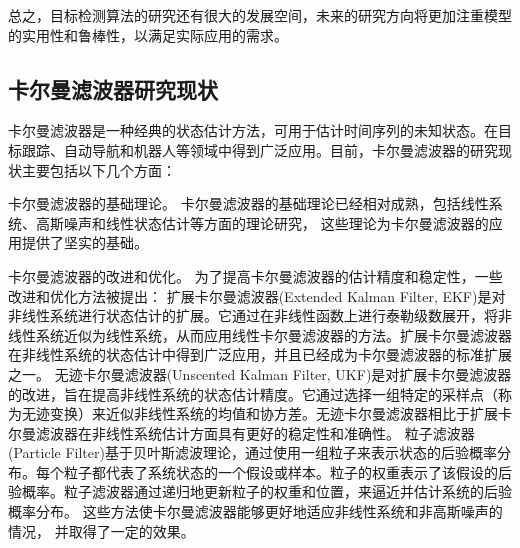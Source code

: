 总之，目标检测算法的研究还有很大的发展空间，未来的研究方向将更加注重模型的实用性和鲁棒性，以满足实际应用的需求。

\subsection{卡尔曼滤波器研究现状}
卡尔曼滤波器是一种经典的状态估计方法，可用于估计时间序列的未知状态。在目标跟踪、自动导航和机器人等领域中得到广泛应用。目前，卡尔曼滤波器的研究现状主要包括以下几个方面：
\par
卡尔曼滤波器的基础理论。
卡尔曼滤波器的基础理论已经相对成熟，包括线性系统、高斯噪声和线性状态估计等方面的理论研究，
这些理论为卡尔曼滤波器的应用提供了坚实的基础。
\par
卡尔曼滤波器的改进和优化。
为了提高卡尔曼滤波器的估计精度和稳定性，一些改进和优化方法被提出：
扩展卡尔曼滤波器(Extended Kalman Filter, EKF)\cite{ribeiro2004kalman}是对非线性系统进行状态估计的扩展。它通过在非线性函数上进行泰勒级数展开，将非线性系统近似为线性系统，从而应用线性卡尔曼滤波器的方法。扩展卡尔曼滤波器在非线性系统的状态估计中得到广泛应用，并且已经成为卡尔曼滤波器的标准扩展之一。
无迹卡尔曼滤波器(Unscented Kalman Filter, UKF)\cite{wan2000unscented}是对扩展卡尔曼滤波器的改进，旨在提高非线性系统的状态估计精度。它通过选择一组特定的采样点（称为无迹变换）来近似非线性系统的均值和协方差。无迹卡尔曼滤波器相比于扩展卡尔曼滤波器在非线性系统估计方面具有更好的稳定性和准确性。
粒子滤波器(Particle Filter)\cite{gustafsson2010particle}基于贝叶斯滤波理论，通过使用一组粒子来表示状态的后验概率分布。每个粒子都代表了系统状态的一个假设或样本。粒子的权重表示了该假设的后验概率。粒子滤波器通过递归地更新粒子的权重和位置，来逼近并估计系统的后验概率分布。
这些方法使卡尔曼滤波器能够更好地适应非线性系统和非高斯噪声的情况，
并取得了一定的效果。

